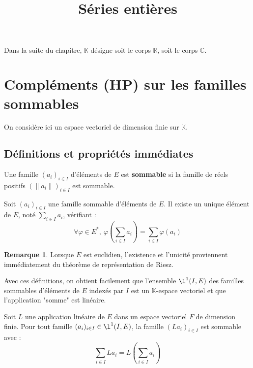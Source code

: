 \documentclass[french]{article}
\title{Séries entières}
\date{}
\newcommand{\R}{\mathbb{R}}
\newcommand{\C}{\mathbb{C}}
\newcommand{\K}{\mathbb{K}}
\newcommand{\st}{^*}
\theoremstyle{plain}
\theoremstyle{definition}
\newtheorem*{rmq}{Remarque}
\theoremstyle{remark}
\begin{document}
\tableofcontents

\newpage
\maketitle

Dans la suite du chapitre, $\K$ désigne soit le corps $\R$, soit le corps $\C$.

\section{Compléments (HP) sur les familles sommables}

On considère ici un espace vectoriel de dimension finie sur $\K$.

\subsection{Définitions et propriétés immédiates}

\begin{dfn}
	Une famille $(a_i)_{i\in I}$ d'éléments de $E$ est \textbf{sommable} si la famille de réels positifs $(\lVert a_i\rVert)_{i\in I}$ est sommable.
\end{dfn}

\begin{dfn}
	Soit $(a_i)_{i\in I}$ une famille sommable d'éléments de $E$. Il existe un unique élément de $E$, noté $\displaystyle\sum_{i\in I}a_i$, vérifiant : $$\forall\varphi\in E\st,\ \varphi\left(\sum_{i\in I}a_i\right)=\sum_{i\in I}\varphi(a_i)$$
\end{dfn}

\begin{rmq}
	Lorsque $E$ est euclidien, l'existence et l'unicité proviennent immédiatement du théorème de représentation de Riesz.
\end{rmq}

Avec ces définitions, on obtient facilement que l'ensemble $\l^1(I,E)$ des familles sommables d'éléments de $E$ indexés par $I$ est un $\K$-espace vectoriel et que l'application "somme" est linéaire.

\begin{prop}%
	Soit $L$ une application linéaire de $E$ dans un espace vectoriel $F$ de dimension finie. Pour tout famille $(a_i)_{i\in I}\in\l^1(I,E)$, la famille $(La_i)_{i\in I}$ est sommable avec : $$\sum_{i\in I}La_i=L\left(\sum_{i\in I}a_i\right)$$
\end{prop}
\end{document}
